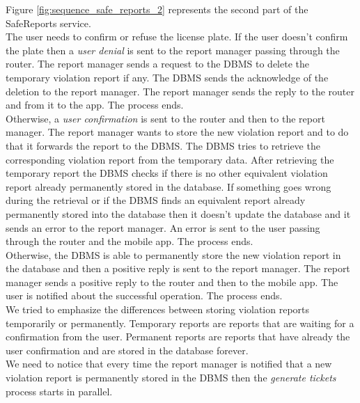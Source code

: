 \documentclass[./main.tex]{subfiles}
\begin{document}
\clearpage

Figure \ref{fig:sequence_safe_reports_2} represents the second part of the SafeReports service.\\
The user needs to confirm or refuse the license plate.
If the user doesn't confirm the plate then a \textit{user denial} is sent to the report manager passing through the router. The report manager sends a request to the DBMS to delete the temporary violation report if any. The DBMS sends the acknowledge of the deletion to the report manager. The report manager sends the reply to the router and from it to the app. The process ends.\\
Otherwise, a \textit{user confirmation} is sent to the router and then to the report manager.
The report manager wants to store the new violation report and to do that it forwards the report to the DBMS. The DBMS tries to retrieve the corresponding violation report from the temporary data. After retrieving the temporary report the DBMS checks if there is no other equivalent violation report already permanently stored in the database.
If something goes wrong during the retrieval or if the DBMS finds an equivalent report already permanently stored into the database then it doesn't update the database and it sends an error to the report manager. An error is sent to the user passing through the router and the mobile app. The process ends.\\
Otherwise, the DBMS is able to permanently store the new violation report in the database and then a positive reply is sent to the report manager. The report manager sends a positive reply to the router and then to the mobile app. The user is notified about the successful operation. The process ends.\\
We tried to emphasize the differences between storing violation reports temporarily or permanently. Temporary reports are reports that are waiting for a confirmation from the user. Permanent reports are reports that have already the user confirmation and are stored in the database forever.\\
We need to notice that every time the report manager is notified that a new violation report is permanently stored in the DBMS then the \textit{generate tickets} process starts in parallel.
\end{document}
